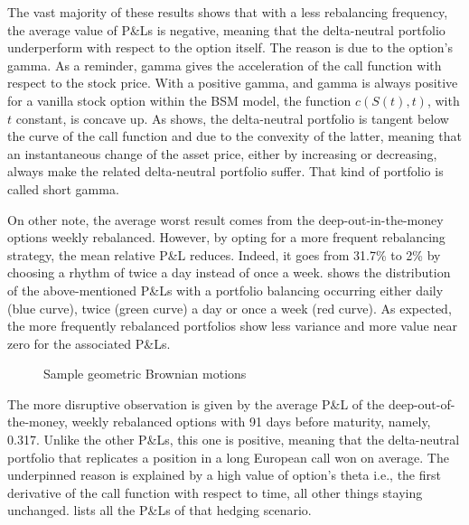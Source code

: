 \documentclass[12pt]{report}
\begin{document}
The vast majority of these results shows that with a less rebalancing frequency, the average value of P\&Ls is negative, meaning that the delta-neutral portfolio underperform with respect to the option itself. The reason is due to the option's gamma. 
As a reminder, gamma gives the acceleration of the call function with respect to the stock price.
With a positive gamma, and gamma is always positive for a vanilla stock option within the BSM model, the function $c(S(t), t)$, with $t$  constant, is concave up. 
As \citet{shreve} shows, the delta-neutral portfolio is tangent below the curve of the call function and due to the convexity of the latter, meaning that an instantaneous change of the asset price, either by increasing or decreasing, always make the related delta-neutral portfolio suffer. 
That kind of portfolio is called short gamma.







On other note, the average worst result comes from the deep-out-in-the-money options weekly rebalanced.
However, by opting for a more frequent rebalancing strategy, the mean relative P\&L reduces.  
Indeed, it goes from 31.7\% to 2\% by choosing a rhythm of twice a day instead of once a week.
 shows the distribution of the above-mentioned P\&Ls with a portfolio balancing occurring either daily (blue curve), twice (green curve) a day or once a week (red curve).
As expected, the more frequently rebalanced portfolios show less variance and more value near zero for the associated P\&Ls.

\begin{figure}[ht]
  \centering
  
  \caption{Sample geometric Brownian motions}
  \label{p:analysis:gbm:pl:better}
\end{figure}


The more disruptive observation is given by the average P\&L of the deep-out-of-the-money, weekly rebalanced options with 91 days before maturity, namely, 0.317.
Unlike the other P\&Ls, this one is positive, meaning that the delta-neutral portfolio that replicates a position in a long European call won on average.
The underpinned reason is explained by a high value of option's theta i.e., the first derivative of the call function with respect to time, all other things staying unchanged.
 lists all the P\&Ls of that hedging scenario.
\end{document}
